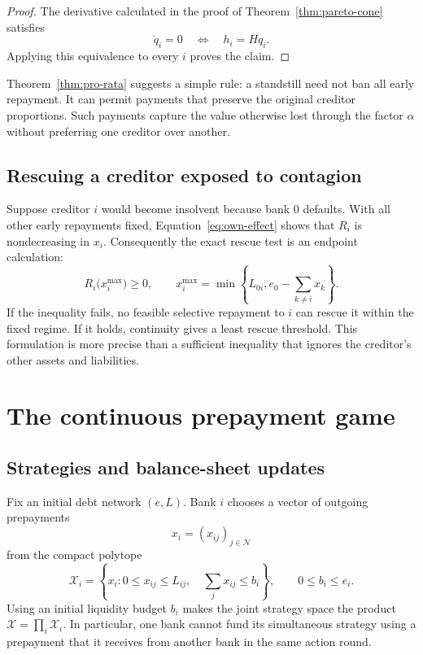 \documentclass[11pt]{article}
\theoremstyle{definition}
\theoremstyle{remark}
\newcommand{\N}{\mathcal{N}}
\begin{document}
\begin{proof}
The derivative calculated in the proof of
Theorem~\ref{thm:pareto-cone} satisfies
\begin{equation}
  \dot q_i=0
  \quad\Longleftrightarrow\quad
  h_i=Hq_i.
\end{equation}
Applying this equivalence to every $i$ proves the claim.
\end{proof}

Theorem~\ref{thm:pro-rata} suggests a simple rule: a standstill need not ban
all early repayment.  It can permit payments that preserve the original
creditor proportions.  Such payments capture the value otherwise lost through
the factor $\alpha$ without preferring one creditor over another.

\subsection{Rescuing a creditor exposed to contagion}

Suppose creditor $i$ would become insolvent because bank $0$ defaults.  With
all other early repayments fixed, Equation~\eqref{eq:own-effect} shows that
$R_i$ is nondecreasing in $x_i$.  Consequently the exact rescue test is an
endpoint calculation:
\begin{equation}
  R_i\bigl(x_i^{\max}\bigr)\geq0,
  \qquad
  x_i^{\max}=\min\left\{L_{0i},
  e_0-\sum_{k\neq i}x_k\right\}.
\end{equation}
If the inequality fails, no feasible selective repayment to $i$ can rescue it
within the fixed regime.  If it holds, continuity gives a least rescue
threshold.  This formulation is more precise than a sufficient inequality
that ignores the creditor's other assets and liabilities.

\section{The continuous prepayment game}\label{sec:continuous-game}

\subsection{Strategies and balance-sheet updates}

Fix an initial debt network $(e,L)$.  Bank $i$ chooses a vector of outgoing
prepayments
\begin{equation}
  x_i=(x_{ij})_{j\in\N}
\end{equation}
from the compact polytope
\begin{equation}\label{eq:strategy-polytope}
  \mathcal X_i=
  \left\{x_i:
  0\leq x_{ij}\leq L_{ij},\quad
  \sum_jx_{ij}\leq b_i\right\},
  \qquad 0\leq b_i\leq e_i.
\end{equation}
Using an initial liquidity budget $b_i$ makes the joint strategy space the
product $\mathcal X=\prod_i\mathcal X_i$.  In particular, one bank cannot fund
its simultaneous strategy using a prepayment that it receives from another
bank in the same action round.
\end{document}
